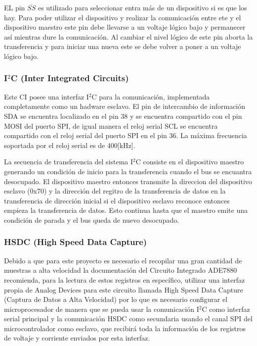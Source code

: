 \documentclass[letterpaper,12pt,oneside]{book}
\begin{document}
			EL pin $\overline{SS}$ es utilizado para seleccionar entra más de un dispositivo si es que los hay. Para poder utilizar el dispositivo y realizar la comunicación entre ete y el dispositivo maestro este pin debe llevarse a un voltaje lógico bajo y permanecer así mientras dure la comunicación. Al cambiar el nivel lógico de este pin aborta la transferencia y para iniciar una nueva este se debe volver a poner a un voltaje lógico bajo.

			\subsubsection{I$^2$C (Inter Integrated Circuits)}
			Este CI posee una interfaz I$^2$C para la comunicación, implementada completamente como un hadware esclavo. El pin de intercambio de información SDA se encuentra localizado en el pin 38 y se encuentra compartido con el pin MOSI del puerto SPI, de igual manera el reloj serial SCL se encuentra compartido con el reloj serial del puerto SPI en el pin 36. La máxima frecuencia soportada por el reloj serial es de 400[kHz].

			La secuencia de transferencia del sistema I$^2$C consiste en el dispositivo maestro generando un condición de inicio para la transferencia cuando el bus se encuantra desocupado. El dispositivo maestro entonces transmite la direccion del dispositivo esclavo (0x70) y la dirección del regitro de la transferencia de datos en la transferencia de dirección inicial si el dispositivo esclavo reconoce entonces empieza la transferencia de datos. Esto continua hasta que el maestro emite una condición de parada y el bus queda de nuevo desocupado.

			\subsubsection{HSDC (High Speed Data Capture)}
			Debido a que para este proyecto es necesario el recopilar una gran cantidad de muestras a alta velocidad la documentación del Circuito Integrado ADE7880 recomienda, para la lectura de estos registros en específico, utilizar una interfaz propia de Analog Devices para este circuito llamada High Speed Data Capture (Captura de Datos a Alta Velocidad) por lo que es necesario configurar el microprocesador de manera que se pueda usar la comunicación I$^2$C como interfaz serial principal y la comunicación HSDC como secundaria usando el canal SPI del microcontrolador como esclavo, que recibirá toda la información de los registros de voltaje y corriente enviados por esta interfaz.
\end{document}
